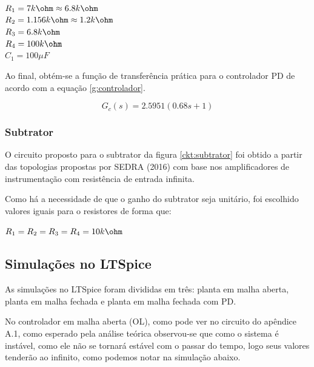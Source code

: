 \begin{center}
    $R_1 = 7k\ohm \approx 6.8k\ohm$ \vspace{5pt}\\
    $R_2 = 1.156k\ohm \approx 1.2k\ohm$ \vspace{5pt}\\
    $R_3 = 6.8k \ohm$ \vspace{5pt}\\
    $R_4 = 100k\ohm$ \vspace{5pt}\\
    $C_1 = 100 \mu F$ 
\end{center}

Ao final, obtém-se a função de transferência prática para o controlador PD de acordo com a equação \ref{g:controlador}.

\begin{equation} \label{g:controlador}
    G_c(s) =2.5951(0.68s+1)
\end{equation}




\subsubsection{Subtrator}

O circuito proposto para o subtrator da figura \ref{ckt:subtrator} foi obtido a partir das topologias propostas por SEDRA (2016) com base nos amplificadores de instrumentação com resistência de entrada infinita.



Como há a necessidade de que o ganho do subtrator seja unitário, foi escolhido valores iguais para o resistores de forma que:

\begin{center}
    $R_1 = R_2 = R_3 = R_4 = 10k\ohm$ 
\end{center}

\subsection{Simulações no LTSpice}

As simulações no LTSpice foram divididas em três: planta em malha aberta, planta em malha fechada e planta em malha fechada com PD.

No controlador em malha aberta (OL), como pode ver no circuito do apêndice A.1, como esperado pela análise teórica observou-se que como o sistema é instável, como ele não se tornará estável com o passar do tempo, logo seus valores tenderão ao infinito, como podemos notar na simulação abaixo.

